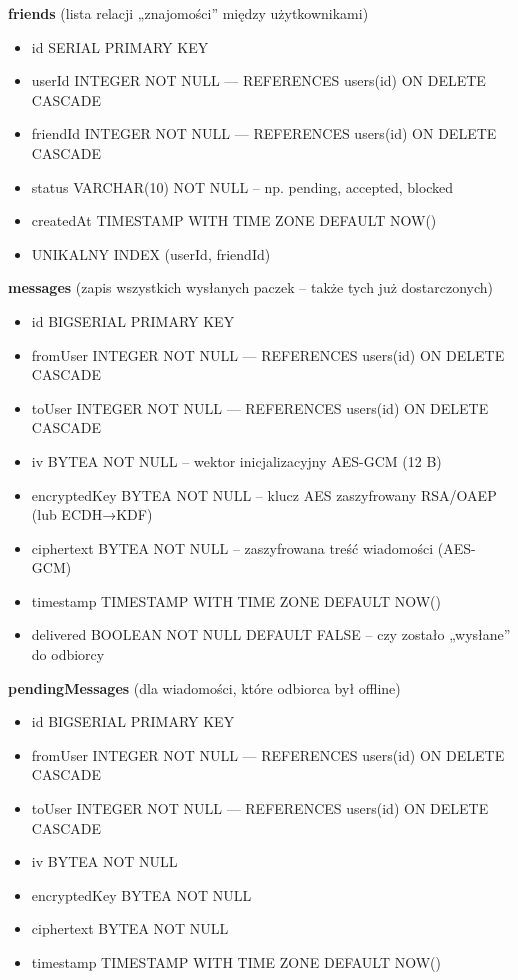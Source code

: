 \documentclass[a4paper,12pt]{article}
\begin{document}
\textbf{friends} (lista relacji „znajomości” między użytkownikami)
\begin{itemize}
    \item id SERIAL PRIMARY KEY
    \item userId INTEGER NOT NULL  — REFERENCES users(id) ON DELETE CASCADE
    \item friendId INTEGER NOT NULL  — REFERENCES users(id) ON DELETE CASCADE
    \item status VARCHAR(10) NOT NULL  – np. pending, accepted, blocked
    \item createdAt TIMESTAMP WITH TIME ZONE DEFAULT NOW()
    \item UNIKALNY INDEX (userId, friendId)
\end{itemize}

\textbf{messages} (zapis wszystkich wysłanych paczek – także tych już dostarczonych)
\begin{itemize}
    \item id BIGSERIAL PRIMARY KEY
    \item fromUser INTEGER NOT NULL  — REFERENCES users(id) ON DELETE CASCADE
    \item toUser INTEGER NOT NULL  — REFERENCES users(id) ON DELETE CASCADE
    \item iv BYTEA NOT NULL  – wektor inicjalizacyjny AES-GCM (12 B)
    \item encryptedKey BYTEA NOT NULL  – klucz AES zaszyfrowany RSA/OAEP (lub ECDH→KDF)
    \item ciphertext BYTEA NOT NULL  – zaszyfrowana treść wiadomości (AES-GCM)
    \item timestamp TIMESTAMP WITH TIME ZONE DEFAULT NOW()
    \item delivered BOOLEAN NOT NULL DEFAULT FALSE  – czy zostało „wysłane” do odbiorcy
\end{itemize}

\textbf{pendingMessages} (dla wiadomości, które odbiorca był offline)
\begin{itemize}
    \item id BIGSERIAL PRIMARY KEY
    \item fromUser INTEGER NOT NULL  — REFERENCES users(id) ON DELETE CASCADE
    \item toUser INTEGER NOT NULL  — REFERENCES users(id) ON DELETE CASCADE
    \item iv BYTEA NOT NULL
    \item encryptedKey BYTEA NOT NULL
    \item ciphertext BYTEA NOT NULL
    \item timestamp TIMESTAMP WITH TIME ZONE DEFAULT NOW()
\end{itemize}
\end{document}
